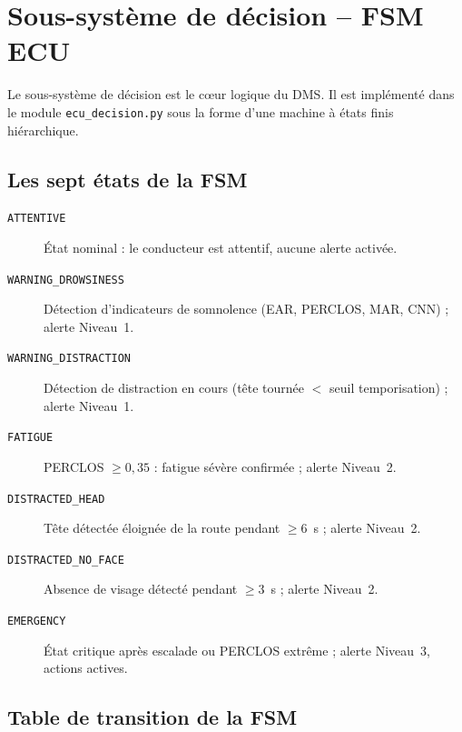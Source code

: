 \documentclass[12pt,a4paper]{report}
\begin{document}
\section{Sous-syst\`eme de d\'ecision -- FSM ECU}

Le sous-syst\`eme de d\'ecision est le c\oe ur logique du DMS. Il est impl\'ement\'e dans le module \texttt{ecu\_decision.py} sous la forme d'une machine \`a \'etats finis hi\'erarchique.

\subsection{Les sept \'etats de la FSM}

\begin{description}
  \item[\texttt{ATTENTIVE}] \'Etat nominal : le conducteur est attentif, aucune alerte activ\'ee.
  \item[\texttt{WARNING\_DROWSINESS}] D\'etection d'indicateurs de somnolence (EAR, PERCLOS, MAR, CNN) ; alerte Niveau~1.
  \item[\texttt{WARNING\_DISTRACTION}] D\'etection de distraction en cours (t\^ete tourn\'ee $<$ seuil temporisation) ; alerte Niveau~1.
  \item[\texttt{FATIGUE}] PERCLOS $\geq 0{,}35$ : fatigue s\'ev\`ere confirm\'ee ; alerte Niveau~2.
  \item[\texttt{DISTRACTED\_HEAD}] T\^ete d\'etect\'ee \'eloign\'ee de la route pendant $\geq 6$~s ; alerte Niveau~2.
  \item[\texttt{DISTRACTED\_NO\_FACE}] Absence de visage d\'etect\'e pendant $\geq 3$~s ; alerte Niveau~2.
  \item[\texttt{EMERGENCY}] \'Etat critique apr\`es escalade ou PERCLOS extr\^eme ; alerte Niveau~3, actions actives.
\end{description}

\subsection{Table de transition de la FSM}
\end{document}
